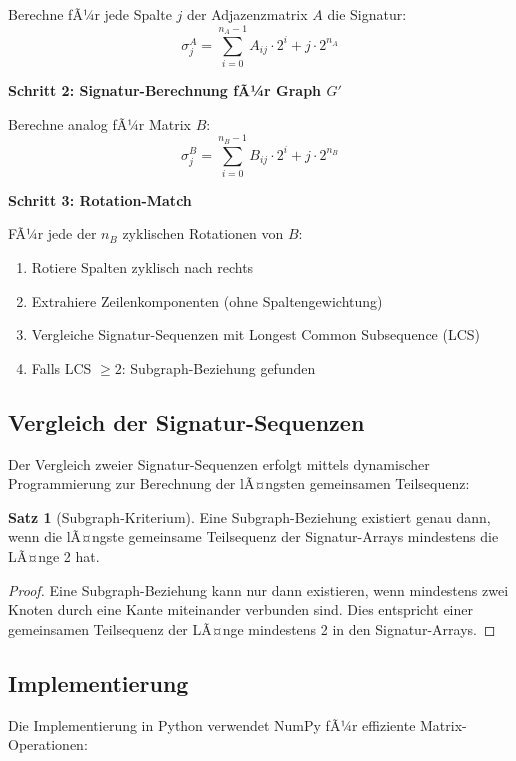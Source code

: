 ﻿\documentclass[a4paper,12pt]{article}
\theoremstyle{definition}
\newtheorem{satz}{Satz}
\begin{document}
Berechne fÃ¼r jede Spalte $j$ der Adjazenzmatrix $A$ die Signatur:
\[
\sigma_j^A = \sum_{i=0}^{n_A-1} A_{ij} \cdot 2^i + j \cdot 2^{n_A}
\]

\textbf{Schritt 2: Signatur-Berechnung fÃ¼r Graph $G'$}

Berechne analog fÃ¼r Matrix $B$:
\[
\sigma_j^B = \sum_{i=0}^{n_B-1} B_{ij} \cdot 2^i + j \cdot 2^{n_B}
\]

\textbf{Schritt 3: Rotation-Match}

FÃ¼r jede der $n_B$ zyklischen Rotationen von $B$:
\begin{enumerate}
	\item Rotiere Spalten zyklisch nach rechts
	\item Extrahiere Zeilenkomponenten (ohne Spaltengewichtung)
	\item Vergleiche Signatur-Sequenzen mit Longest Common Subsequence (LCS)
	\item Falls LCS $\geq 2$: Subgraph-Beziehung gefunden
\end{enumerate}

\subsection{Vergleich der Signatur-Sequenzen}

Der Vergleich zweier Signatur-Sequenzen erfolgt mittels dynamischer Programmierung zur Berechnung der lÃ¤ngsten gemeinsamen Teilsequenz:

\begin{satz}[Subgraph-Kriterium]
	Eine Subgraph-Beziehung existiert genau dann, wenn die lÃ¤ngste gemeinsame Teilsequenz der Signatur-Arrays mindestens die LÃ¤nge 2 hat.
\end{satz}

\begin{proof}
	Eine Subgraph-Beziehung kann nur dann existieren, wenn mindestens zwei Knoten durch eine Kante miteinander verbunden sind. Dies entspricht einer gemeinsamen Teilsequenz der LÃ¤nge mindestens 2 in den Signatur-Arrays.
\end{proof}

\subsection{Implementierung}

Die Implementierung in Python verwendet NumPy fÃ¼r effiziente Matrix-Operationen:
\end{document}
